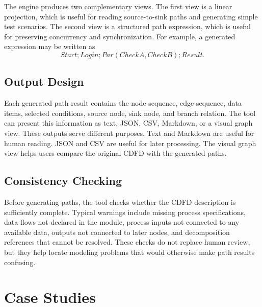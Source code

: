 \documentclass[conference]{template/IEEEtran}
\begin{document}
The engine produces two complementary views. The first view is a linear projection, which is useful for reading source-to-sink paths and generating simple test scenarios. The second view is a structured path expression, which is useful for preserving concurrency and synchronization. For example, a generated expression may be written as
\begin{equation}
Start;Login;Par(CheckA,CheckB);Result .
\end{equation}

\subsection{Output Design}

Each generated path result contains the node sequence, edge sequence, data items, selected conditions, source node, sink node, and branch relation. The tool can present this information as text, JSON, CSV, Markdown, or a visual graph view. These outputs serve different purposes. Text and Markdown are useful for human reading. JSON and CSV are useful for later processing. The visual graph view helps users compare the original CDFD with the generated paths.

\subsection{Consistency Checking}

Before generating paths, the tool checks whether the CDFD description is sufficiently complete. Typical warnings include missing process specifications, data flows not declared in the module, process inputs not connected to any available data, outputs not connected to later nodes, and decomposition references that cannot be resolved. These checks do not replace human review, but they help locate modeling problems that would otherwise make path results confusing.

\section{Case Studies}
\end{document}
